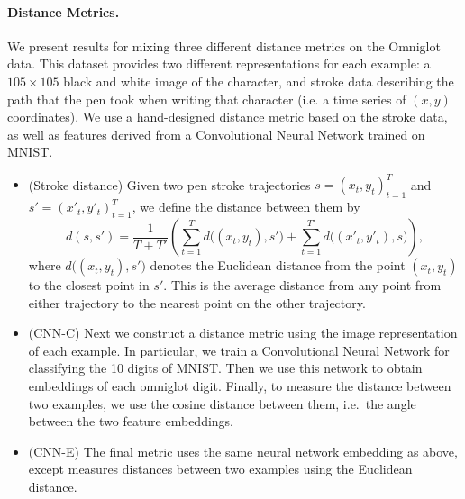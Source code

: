 \paragraph{Distance Metrics.} We present results for mixing three different distance metrics on the Omniglot data. This dataset provides two different representations for each example: a $105 \times 105$ black and white image of the character, and stroke data describing the path that the pen took when writing that character (i.e. a time series of $(x,y)$ coordinates). We use a hand-designed distance metric based on the stroke data, as well as features derived from a Convolutional Neural Network trained on MNIST.
%
\begin{itemize}
  \item (Stroke distance) Given two pen stroke trajectories $s = (x_t,
  y_t)_{t=1}^T$ and $s' = (x'_t, y'_t)_{t=1}^T$, we define the distance between
  them by
  \[
    d(s,s') = \frac{1}{T + T'} \left(
      \sum_{t=1}^T d\bigl((x_t, y_t), s'\bigr)
      +
      \sum_{t=1}^{T'} d\bigl((x'_t, y'_t), s\bigr)
    \right),
  \]
  where $d\bigl((x_t, y_t), s'\bigr)$ denotes the Euclidean distance from the
  point $(x_t, y_t)$ to the closest point in $s'$. This is the average distance
  from any point from either trajectory to the nearest point on the other
  trajectory.
  \item (CNN-C) Next we construct a distance metric using the image
  representation of each example. In particular, we train a Convolutional Neural
  Network for classifying the 10 digits of MNIST. Then we use this network to
  obtain embeddings of each omniglot digit. Finally, to measure the distance
  between two examples, we use the cosine distance between them, i.e.\ the
  angle between the two feature embeddings.
  \item (CNN-E) The final metric uses the same neural network embedding as
  above, except measures distances between two examples using the Euclidean
  distance.
\end{itemize}

